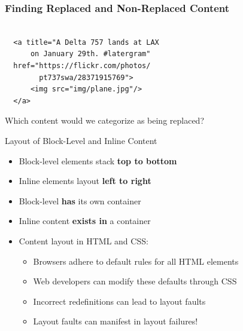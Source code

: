 \documentclass[14pt,aspectratio=169]{beamer}
\begin{document}
%
\begin{frame}[fragile]
  \frametitle{Finding Replaced and Non-Replaced Content}
  \normalsize
  \begin{minipage}{6in}
    \vspace*{.2in}
    \begin{verbatim}

  <a title="A Delta 757 lands at LAX
      on January 29th. #latergram"
  href="https://flickr.com/photos/
        pt737swa/28371915769">
      <img src="img/plane.jpg"/>
  </a>

    \end{verbatim}
  \end{minipage}
  \vspace*{.1in}
  \begin{center}
    Which content would we categorize as being replaced?
  \end{center}
\end{frame}

%
\begin{frame}{Layout of Block-Level and Inline Content}
  \begin{itemize}
    \item Block-level elements stack {\bf top to bottom}
      \vspace*{-.2in}
    \item Inline elements layout {\bf left to right}
      \vspace*{-.2in}
    \item Block-level {\bf has} its own container
      \vspace*{-.2in}
    \item Inline content {\bf exists in} a container
      \vspace*{-.2in}
    \item Content layout in HTML and CSS:
      \begin{itemize}
        \item Browsers adhere to default rules for all HTML elements
        \item Web developers can modify these defaults through CSS
        \item Incorrect redefinitions can lead to layout faults
        \item Layout faults can manifest in layout failures!
      \end{itemize}
  \end{itemize}
\end{frame}
\end{document}

